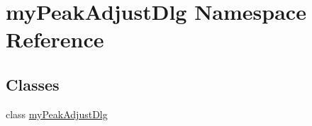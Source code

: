 \hypertarget{namespacemy_peak_adjust_dlg}{\section{my\-Peak\-Adjust\-Dlg Namespace Reference}
\label{namespacemy_peak_adjust_dlg}
}
\subsection*{Classes}
\begin{DoxyCompactItemize}
\item 
class \hyperlink{classmy_peak_adjust_dlg_1_1my_peak_adjust_dlg}{my\-Peak\-Adjust\-Dlg}
\end{DoxyCompactItemize}
